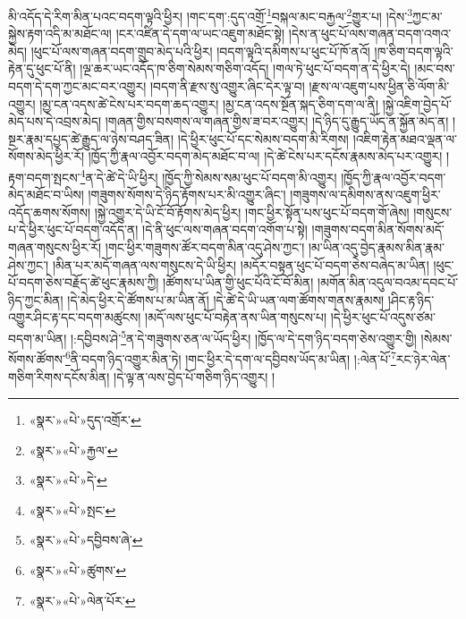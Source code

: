 མི་འདོད་དེ་རིག་མིན་པའང་བདག་ལྟའི་ཕྱིར། །གང་དག་:དུད་འགྲོ་\footnote{«སྣར་»«པེ་»དུད་འགྲོར་}བསྐལ་མང་བརྐྱལ་\footnote{«སྣར་»«པེ་»རྐྱལ་}གྱུར་པ། །དེས་\footnote{«སྣར་»«པེ་»དེ་}ཀྱང་མ་སྐྱེས་རྟག་འདི་མ་མཐོང་ལ། །ངར་འཛིན་དེ་དག་ལ་ཡང་འཇུག་མཐོང་སྟེ། །དེས་ན་ཕུང་པོ་ལས་གཞན་བདག་འགའ་མེད། །ཕུང་པོ་ལས་གཞན་བདག་གྲུབ་མེད་པའི་ཕྱིར། །བདག་ལྟའི་དམིགས་པ་ཕུང་པོ་ཁོ་ནའོ། །ཁ་ཅིག་བདག་ལྟའི་རྟེན་དུ་ཕུང་པོ་ནི། །ལྔ་ཆར་ཡང་འདོད་ཁ་ཅིག་སེམས་གཅིག་འདོད། །གལ་ཏེ་ཕུང་པོ་བདག་ན་དེ་ཕྱིར་དེ། །མང་བས་བདག་དེ་དག་ཀྱང་མང་བར་འགྱུར། །བདག་ནི་རྫས་སུ་འགྱུར་ཞིང་དེར་ལྟ་བ། །རྫས་ལ་འཇུག་པས་ཕྱིན་ཅི་ལོག་མི་འགྱུར། །མྱ་ངན་འདས་ཚེ་ངེས་པར་བདག་ཆད་འགྱུར། །མྱ་ངན་འདས་སྔོན་སྐད་ཅིག་དག་ལ་ནི། །སྐྱེ་འཇིག་བྱེད་པོ་མེད་པས་དེ་འབྲས་མེད། །གཞན་གྱིས་བསགས་ལ་གཞན་གྱིས་ཟ་བར་འགྱུར། །དེ་ཉིད་དུ་རྒྱུད་ཡོད་ན་སྐྱོན་མེད་ན། །སྔར་རྣམ་དཔྱད་ཚེ་རྒྱུད་ལ་ཉེས་བཤད་ཟིན། །དེ་ཕྱིར་ཕུང་པོ་དང་སེམས་བདག་མི་རིགས། །འཇིག་རྟེན་མཐའ་ལྡན་ལ་སོགས་མེད་ཕྱིར་རོ། །ཁྱོད་ཀྱི་རྣལ་འབྱོར་བདག་མེད་མཐོང་བ་ལ། །དེ་ཚེ་ངེས་པར་དངོས་རྣམས་མེད་པར་འགྱུར། །རྟག་བདག་སྤངས་\footnote{«སྣར་»«པེ་»སྤང་}ན་དེ་ཚེ་དེ་ཡི་ཕྱིར། །ཁྱོད་ཀྱི་སེམས་སམ་ཕུང་པོ་བདག་མི་འགྱུར། །ཁྱོད་ཀྱི་རྣལ་འབྱོར་བདག་མེད་མཐོང་བ་ཡིས། །གཟུགས་སོགས་དེ་ཉིད་རྟོགས་པར་མི་འགྱུར་ཞིང་། །གཟུགས་ལ་དམིགས་ནས་འཇུག་ཕྱིར་འདོད་ཆགས་སོགས། །སྐྱེ་འགྱུར་དེ་ཡི་ངོ་བོ་རྟོགས་མེད་ཕྱིར། །གང་ཕྱིར་སྟོན་པས་ཕུང་པོ་བདག་གོ་ཞེས། །གསུངས་པ་དེ་ཕྱིར་ཕུང་པོ་བདག་འདོད་ན། །དེ་ནི་ཕུང་ལས་གཞན་བདག་འགོག་པ་སྟེ། །གཟུགས་བདག་མིན་སོགས་མདོ་གཞན་གསུངས་ཕྱིར་རོ། །གང་ཕྱིར་གཟུགས་ཚོར་བདག་མིན་འདུ་ཤེས་ཀྱང་། །མ་ཡིན་འདུ་བྱེད་རྣམས་མིན་རྣམ་ཤེས་ཀྱང་། །མིན་པར་མདོ་གཞན་ལས་གསུངས་དེ་ཡི་ཕྱིར། །མདོར་བསྟན་ཕུང་པོ་བདག་ཅེས་བཞེད་མ་ཡིན། །ཕུང་པོ་བདག་ཅེས་བརྗོད་ཚེ་ཕུང་རྣམས་ཀྱི། །ཚོགས་པ་ཡིན་གྱི་ཕུང་པོའི་ངོ་བོ་མིན། །མགོན་མིན་འདུལ་བའམ་དབང་པོ་ཉིད་ཀྱང་མིན། །དེ་མེད་ཕྱིར་དེ་ཚོགས་པ་མ་ཡིན་ནོ། །དེ་ཚེ་དེ་ཡི་ཡན་ལག་ཚོགས་གནས་རྣམས། །ཤིང་རྟ་ཉིད་འགྱུར་ཤིང་རྟ་དང་བདག་མཚུངས། །མདོ་ལས་ཕུང་པོ་བརྟེན་ནས་ཡིན་གསུངས་པ། །དེ་ཕྱིར་ཕུང་པོ་འདུས་ཙམ་བདག་མ་ཡིན། །:དབྱིབས་ཤེ་\footnote{«སྣར་»«པེ་»དབྱིབས་ཞེ་}ན་དེ་གཟུགས་ཅན་ལ་ཡོད་ཕྱིར། །ཁྱོད་ལ་དེ་དག་ཉིད་བདག་ཅེས་འགྱུར་གྱི། །སེམས་སོགས་ཚོགས་\footnote{«སྣར་»«པེ་»ཚུགས་}ནི་བདག་ཉིད་འགྱུར་མིན་ཏེ། །གང་ཕྱིར་དེ་དག་ལ་དབྱིབས་ཡོད་མ་ཡིན། །:ལེན་པོ་\footnote{«སྣར་»«པེ་»ལེན་པོར་}རང་ཉེར་ལེན་གཅིག་རིགས་དངོས་མིན། །དེ་ལྟ་ན་ལས་བྱེད་པོ་གཅིག་ཉིད་འགྱུར། །
